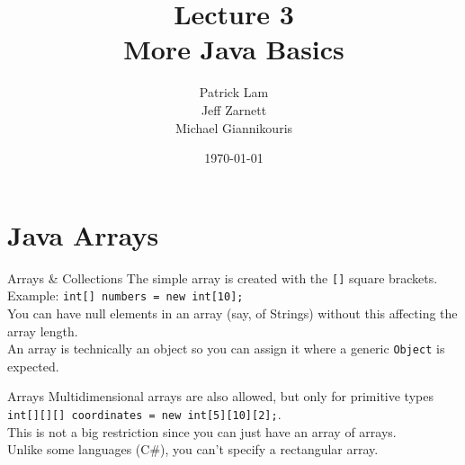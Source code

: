 \documentclass{beamer}
\title{Lecture 3 \\ More Java Basics}
\date{\today}
\author{Patrick Lam \\ Jeff Zarnett \\ Michael Giannikouris}
\institute{Department of Electrical and Computer Engineering}
\begin{document}
\maketitle

\section{Java Arrays}

\begin{frame}{Arrays \& Collections}
The simple array is created with the \texttt{[]} square brackets. \\
\vspace{0.5em}
Example: \texttt{int[] numbers = new int[10];} \\
\vspace{0.5em}
You can have null elements in an array (say, of Strings) without this affecting the array length. \\
\vspace{0.5em}
An array is technically an object so you can assign it where a generic \texttt{Object} is expected. \\
\end{frame}



\begin{frame}{Arrays}
Multidimensional arrays are also allowed, but only for primitive types \\
\vspace{1em}
\texttt{int[][][]  coordinates = new int[5][10][2];}.  \\
\vspace{1em}
This is not a big restriction since you can just have an array of arrays. \\
\vspace{1em}
Unlike some languages (C\#), you can't specify a rectangular array. \\
\end{frame}
\end{document}
